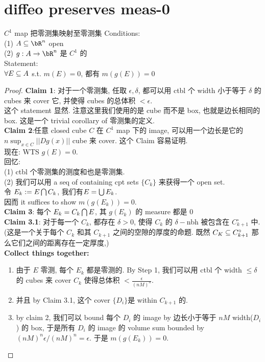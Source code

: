 \documentclass[lang=cn,11pt]{elegantbook}
\begin{document}
\section{diffeo preserves meas-0}
\begin{theorem}{$C^1$ map 把零测集映射至零测集}
Conditions:\\
(1) $A \sub \bR^n$ open\\
(2) $g: A \rar \bR^n$ 是 $C^1$ 的\\
Statement:\\
$\forall E\subseteq A $ s.t. $m(E)= 0$, 都有 $m(g(E)) = 0$ 
\end{theorem}
\begin{proof}
\textbf{Claim 1}: 对于一个零测集, 任取 $\epsilon, \delta$, 都可以用 ctbl 个 width 小于等于 $\delta$ 的 cubes 来 cover 它, 并使得 cubes 的总体积 $< \epsilon$.\\
这个 statement 显然. 注意这里我们使用的是 cube 而不是 box, 也就是边长相同的 box. 这是一个 trivial corollary of 零测集的定义.\\
\textbf{Claim 2}:任意 closed cube $C$ 在 $C^1$ map 下的 image, 可以用一个边长是它的 $n\sup_{x \in C} ||Dg(x)||$ cube 来 cover. 这个 Claim 容易证明.\\
现在: WTS $g(E) = 0$.\\
回忆:\\
(1) ctbl 个零测集的测度和也是零测集.\\
(2) 我们可以用 a seq of containing cpt sets $\{C_k \}$ 来获得一个 open set.\\
令 $E_k := E \bigcap C_k$, 我们有$E = \bigcup E_k$.\\
因而 it suffices to show $m(g(E_k)) = 0$.\\
\textbf{Claim 3}: 每个 $E_k = C_k \bigcap E$, 其 $g(E_k)$ 的 measure 都是 0\\
\textbf{Claim 3.1}: 对于每一个 $C_k$, 都存在 $\delta > 0$, 使得 $C_k$ 的 $\delta-$nbh 被包含在 $C_{k+1} ^ {\circ}$ 中. (这是一个关于每个 $C_k$ 和其 $C_{k+1}$ 之间的空隙的厚度的命题. 既然 $C_K \subseteq C_{k+1} ^ {\circ}$ 那么它们之间的距离存在一定厚度,)\\
\textbf{Collect things together:}
\begin{enumerate}
    \item 由于 $E$ 零测, 每个 $E_k$ 都是零测的. By Step 1, 我们可以用 ctbl 个 width $\leq \delta$ 的 cubes 来 cover $C_k$ 使得总体积 $< \frac{\epsilon}{(nM)^n}$. 
    \item 并且 by Claim 3.1, 这个 cover $\{D_i\}$是 within $C_{k+1} $ 的. 
    \item by claim 2, 我们可以 bound 每个 $D_i$ 的 image by 边长小于等于 $nM$ width($D_i$) 的 box, 于是所有 $D_i$ 的 image 的 volume sum bounded by $(nM)^n \epsilon /(nM)^n = \epsilon$. 于是 $m(g(E_k)) = 0$.
\end{enumerate}
\end{proof}
\end{document}
